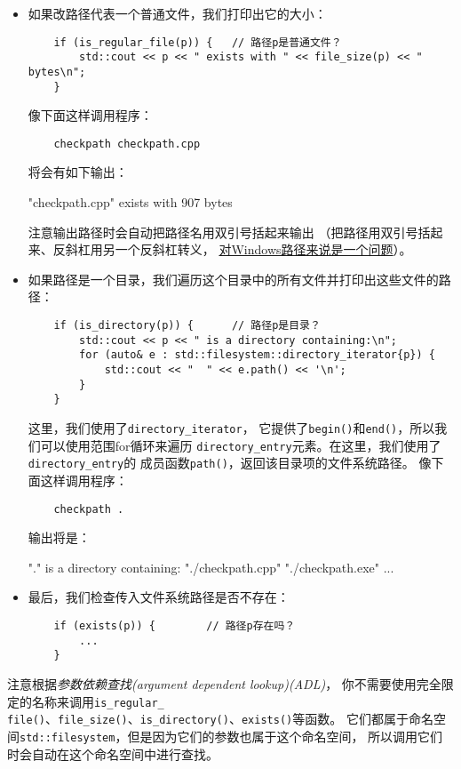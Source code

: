\begin{itemize}
    \item 如果改路径代表一个普通文件，我们打印出它的大小：
    \begin{lstlisting}
    if (is_regular_file(p)) {   // 路径p是普通文件？
        std::cout << p << " exists with " << file_size(p) << " bytes\n";
    }
    \end{lstlisting}
    像下面这样调用程序：
    \begin{lstlisting}
    checkpath checkpath.cpp
    \end{lstlisting}
    将会有如下输出：
    \begin{blacklisting}
    "checkpath.cpp" exists with 907 bytes
    \end{blacklisting}
    注意输出路径时会自动把路径名用双引号括起来输出
    （把路径用双引号括起来、反斜杠用另一个反斜杠转义，
    \hyperref[ch20.1.1.1]{对Windows路径来说是一个问题}）。
    \item 如果路径是一个目录，我们遍历这个目录中的所有文件并打印出这些文件的路径：
    \begin{lstlisting}
    if (is_directory(p)) {      // 路径p是目录？
        std::cout << p << " is a directory containing:\n";
        for (auto& e : std::filesystem::directory_iterator{p}) {
            std::cout << "  " << e.path() << '\n';
        }
    }
    \end{lstlisting}
    这里，我们使用了\texttt{directory\_iterator}，
    它提供了\texttt{begin()}和\texttt{end()}，所以我们可以使用范围for循环来遍历
    \texttt{directory\_entry}元素。在这里，我们使用了\texttt{directory\_entry}的
    成员函数\texttt{path()}，返回该目录项的文件系统路径。
    像下面这样调用程序：
    \begin{lstlisting}
    checkpath .
    \end{lstlisting}
    输出将是：
    \begin{blacklisting}
    "." is a directory containing:
      "./checkpath.cpp"
      "./checkpath.exe"
      ...
    \end{blacklisting}
    \item 最后，我们检查传入文件系统路径是否不存在：
    \begin{lstlisting}
    if (exists(p)) {        // 路径p存在吗？
        ...
    }
    \end{lstlisting}
\end{itemize}
注意根据\emph{参数依赖查找(argument dependent lookup)(ADL)}，
你不需要使用完全限定的名称来调用\texttt{is\_regular\_\\
file()}、\texttt{file\_size()}、\texttt{is\_directory()}、\texttt{exists()}等函数。
它们都属于命名空间\texttt{std::filesystem}，但是因为它们的参数也属于这个命名空间，
所以调用它们时会自动在这个命名空间中进行查找。

